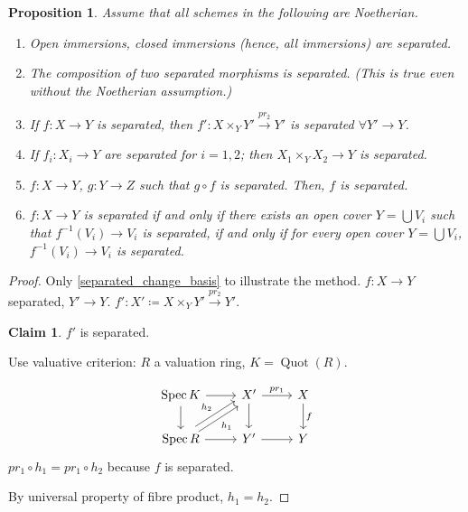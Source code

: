 \documentclass[12pt]{article}
\DeclareMathOperator{\Spec}{Spec}
\DeclareMathOperator{\Quot}{Quot}
\newtheorem*{proposition}{Proposition}
\theoremstyle{definition}
\newtheorem*{claim}{Claim}
\theoremstyle{remark}
\begin{document}
\begin{proposition}
Assume that all schemes in the following are Noetherian.

\begin{enumerate}[label=\arabic*)]
\item Open immersions, closed immersions (hence, all immersions) are separated.

\item The composition of two separated morphisms is separated. (This is true even without the Noetherian assumption.)

\item\label{separated_change_basis} If $f:X\rightarrow Y$ is separated, then $f':X\times_YY'\xrightarrow{pr_2}Y'$ is separated $\forall Y'\rightarrow Y$.

\item If $f_i:X_i\rightarrow Y$ are separated for $i=1,2$; then $X_1\times_YX_2\rightarrow Y$ is separated.

\item $f:X\rightarrow Y$, $g:Y\rightarrow Z$ such that $g\circ f$ is separated. Then, $f$ is separated.

\item $f:X\rightarrow Y$ is separated if and only if there exists an open cover $Y=\bigcup V_i$ such that $f^{-1}(V_i)\rightarrow V_i$ is separated, if and only if for every open cover $Y=\bigcup V_i$, $f^{-1}(V_i)\rightarrow V_i$ is separated.
\end{enumerate}
\end{proposition}

\begin{proof}
Only \ref{separated_change_basis} to illustrate the method. $f:X\rightarrow Y$ separated, $Y'\rightarrow Y$. $f':X'\coloneqq X\times_YY'\xrightarrow{pr_2}Y'$.

\begin{claim}
$f'$ is separated.
\end{claim}

Use valuative criterion: $R$ a valuation ring, $K=\Quot(R)$.

\[
\begin{tikzcd}
\Spec K\arrow[r]\arrow[d]&X'\arrow[r,"pr_1"]\arrow[d]&X\arrow[d,"f"]\\
\Spec R\arrow[r]\arrow[ru,shift left,"h_2"]\arrow[ru,shift right,"h_1",swap]&Y'\arrow[r]&Y
\end{tikzcd}
\]
$pr_1\circ h_1=pr_1\circ h_2$ because $f$ is separated.

By universal property of fibre product, $h_1=h_2$.
\end{proof}
\end{document}
